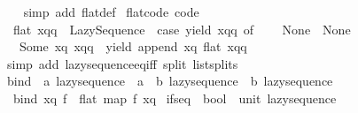 \begin{isabellebody}
%
\isadelimproof
\ \ %
\endisadelimproof
%
\isatagproof
{}\isamarkupfalse%
\ {\isacharparenleft}{\kern0pt}simp\ add{\isacharcolon}{\kern0pt}\ flat{\isacharunderscore}{\kern0pt}def{\isacharparenright}{\kern0pt}%
\endisatagproof
{\isafoldproof}%
%
\isadelimproof
\isanewline
%
\endisadelimproof
\isanewline
{}\isamarkupfalse%
\ flat{\isacharunderscore}{\kern0pt}code\ {\isacharbrackleft}{\kern0pt}code{\isacharbrackright}{\kern0pt}{\isacharcolon}{\kern0pt}\isanewline
\ \ {\isachardoublequoteopen}flat\ xqq\ {\isacharequal}{\kern0pt}\ Lazy{\isacharunderscore}{\kern0pt}Sequence\ {\isacharparenleft}{\kern0pt}{\isasymlambda}{\isacharunderscore}{\kern0pt}{\isachardot}{\kern0pt}\ case\ yield\ xqq\ of\isanewline
\ \ \ \ None\ {\isasymRightarrow}\ None\isanewline
\ \ {\isacharbar}{\kern0pt}\ Some\ {\isacharparenleft}{\kern0pt}xq{\isacharcomma}{\kern0pt}\ xqq{\isacharprime}{\kern0pt}{\isacharparenright}{\kern0pt}\ {\isasymRightarrow}\ yield\ {\isacharparenleft}{\kern0pt}append\ xq\ {\isacharparenleft}{\kern0pt}flat\ xqq{\isacharprime}{\kern0pt}{\isacharparenright}{\kern0pt}{\isacharparenright}{\kern0pt}{\isacharparenright}{\kern0pt}{\isachardoublequoteclose}\isanewline
%
\isadelimproof
\ \ %
\endisadelimproof
%
\isatagproof
{}\isamarkupfalse%
\ {\isacharparenleft}{\kern0pt}simp\ add{\isacharcolon}{\kern0pt}\ lazy{\isacharunderscore}{\kern0pt}sequence{\isacharunderscore}{\kern0pt}eq{\isacharunderscore}{\kern0pt}iff\ split{\isacharcolon}{\kern0pt}\ list{\isachardot}{\kern0pt}splits{\isacharparenright}{\kern0pt}%
\endisatagproof
{\isafoldproof}%
%
\isadelimproof
\isanewline
%
\endisadelimproof
\isanewline
{}\isamarkupfalse%
\ bind\ {\isacharcolon}{\kern0pt}{\isacharcolon}{\kern0pt}\ {\isachardoublequoteopen}{\isacharprime}{\kern0pt}a\ lazy{\isacharunderscore}{\kern0pt}sequence\ {\isasymRightarrow}\ {\isacharparenleft}{\kern0pt}{\isacharprime}{\kern0pt}a\ {\isasymRightarrow}\ {\isacharprime}{\kern0pt}b\ lazy{\isacharunderscore}{\kern0pt}sequence{\isacharparenright}{\kern0pt}\ {\isasymRightarrow}\ {\isacharprime}{\kern0pt}b\ lazy{\isacharunderscore}{\kern0pt}sequence{\isachardoublequoteclose}\isanewline
{}\isanewline
\ \ {\isachardoublequoteopen}bind\ xq\ f\ {\isacharequal}{\kern0pt}\ flat\ {\isacharparenleft}{\kern0pt}map\ f\ xq{\isacharparenright}{\kern0pt}{\isachardoublequoteclose}\isanewline
\isanewline
{}\isamarkupfalse%
\ if{\isacharunderscore}{\kern0pt}seq\ {\isacharcolon}{\kern0pt}{\isacharcolon}{\kern0pt}\ {\isachardoublequoteopen}bool\ {\isasymRightarrow}\ unit\ lazy{\isacharunderscore}{\kern0pt}sequence{\isachardoublequoteclose}\isanewline

\end{isabellebody}
